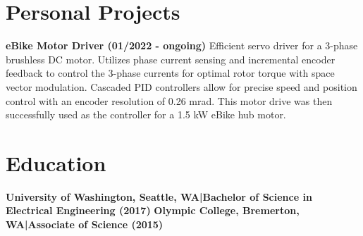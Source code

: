 \documentclass[]{article}
\begin{document}
\begin{singlespace}
\section*{Personal Projects}


\textbf{eBike Motor Driver (01/2022 - ongoing)}\newline
Efficient servo driver for a 3-phase brushless DC motor.
Utilizes phase current sensing and incremental encoder feedback to control the 3-phase currents for optimal rotor torque with space vector modulation.
Cascaded PID controllers allow for precise speed and position control with an encoder resolution of 0.26 mrad.\newline
This motor drive was then successfully used as the controller for a 1.5 kW eBike hub motor.
\vspace{-2mm}\newline\newline

\section*{Education}

\textbf{University of Washington, Seattle, WA\hspace{3 mm}|\hspace{3 mm}Bachelor of Science in Electrical Engineering (2017)}
\vspace{-3mm}
\newline\break\textbf{Olympic College, Bremerton, WA\hspace{3 mm}|\hspace{3 mm}Associate of Science (2015)}

\end{singlespace}
\end{document}
